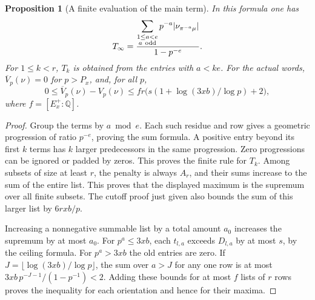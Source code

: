 \documentclass[a4paper,11pt]{article}
\newtheorem{proposition}{Proposition}[section]
\theoremstyle{definition}
\theoremstyle{remark}
\numberwithin{equation}{section}
\begin{document}
\begin{proposition}[A finite evaluation of the main term]\leavevmode
\label{prop:continuousrows510}
In this formula one has
\[
    T_\infty=\frac{\displaystyle
       \sum_{\substack{1\le a<e\\ a\ {\rm odd}}}
                      p^{-a}|\nu_{\pi^{-a}\mu}|}
                      {1-p^{-e}} .
\]
For \(1\le k<r\), \(T_k\) is obtained from the entries with
\(a<ke\). For the actual words,
\(\overline V_p(\nu)=0\) for \(p>P_x\), and, for all \(p\),
\[
       0\le \overline V_p(\nu)-V_p(\nu)
          \le f r\bigl(s(1+\log(3xb)/\log p)+2\bigr),
\]
where \(f=[E_x^+:\mathbb Q]\).
\end{proposition}
\begin{proof}
Group the terms by \(a\bmod e\). Each such residue and row gives
a geometric progression of ratio \(p^{-e}\), proving the sum
formula. A positive entry beyond its first \(k\) terms has \(k\)
larger predecessors in the same progression. Zero progressions
can be ignored or padded by zeros. This proves the finite rule
for \(T_k\). Among subsets of size at least \(r\), the penalty
is always \(A_r\), and their sums increase to the sum of the
entire list. This proves that the displayed maximum is the
supremum over all finite subsets. The cutoff proof just given
also bounds the sum of this larger list by \(6rxb/p\).

Increasing a nonnegative summable list by a total amount \(a_0\)
increases the supremum by at most \(a_0\). For \(p^a\le3xb\),
each \(t_{l,a}\) exceeds \(D_{l,a}\) by at most \(s\), by the
ceiling formula. For \(p^a>3xb\) the old entries are zero. If
\(J=\lfloor\log(3xb)/\log p\rfloor\), the sum over \(a>J\)
for any one row is at most \(3xb\,p^{-J-1}/(1-p^{-1})<2\).
Adding these bounds for at most \(f\) lists of \(r\) rows
proves the inequality for each orientation and hence for
their maxima.
\end{proof}
\end{document}
